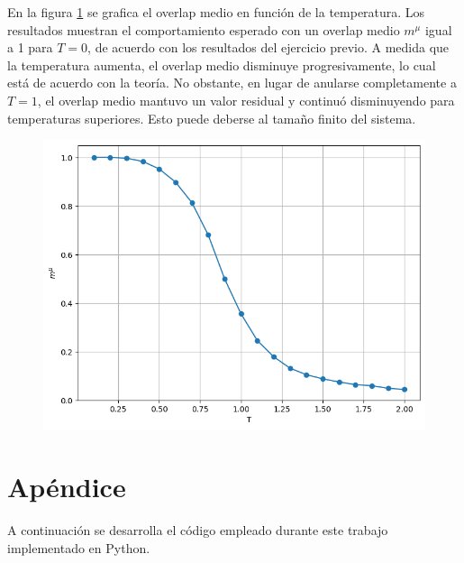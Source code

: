 \documentclass[aps,prb,twocolumn,superscriptaddress,floatfix,longbibliography]{revtex4-2}
\newcounter{para}
\begin{document}
En la figura \ref{fig:ej2_overlap_vs_T} se grafica el overlap medio en función de la temperatura. Los resultados muestran el comportamiento esperado con un overlap medio \( m^\mu \) igual a 1 para \( T = 0 \), de acuerdo con los resultados del ejercicio previo. A medida que la temperatura aumenta, el overlap medio disminuye progresivamente, lo cual está de acuerdo con la teoría. No obstante, en lugar de anularse completamente a \( T = 1 \), el overlap medio mantuvo un valor residual y continuó disminuyendo para temperaturas superiores. Esto puede deberse al tamaño finito del sistema.

\begin{figure}[h]
  \includegraphics[clip=true,width=\columnwidth]{../ej2_overlap_vs_T.png}
  \caption{}
   \label{fig:ej2_overlap_vs_T}
\end{figure}





\onecolumngrid


\section*{Apéndice}
A continuación se desarrolla el código empleado durante este trabajo implementado en Python.
\end{document}
